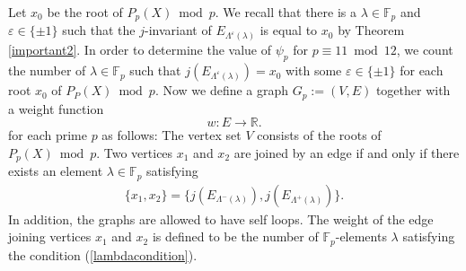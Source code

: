 \documentclass[a4paper, 11pt]{article}
\theoremstyle{plain}
\newcommand{\?}{\textcolor{red}{??}}
\newcommand{\lm}{\lambda}
\newcommand{\Lm}{\Lambda}
\newcommand{\fp}{\mathbb{F}_p}
\begin{document}
Let $x_0$ be the root of $P_p(X) \bmod p$. We recall that there is a $\lm\in \fp$ and $\varepsilon\in\{\pm1\}$ such that the $j$-invariant of $E_{\Lm^{\varepsilon}(\lm)}$  is equal to $x_0$ by Theorem \ref{important2}. In order to determine the value of $\psi_p$ for $p \equiv 11 \bmod 12$, we count the number of $\lm \in \fp$ such that $j(E_{\Lm^{\varepsilon}(\lm)})=x_0$ with some $\varepsilon\in\{\pm1\}$ for each root $x_0$ of $P_P(X) \bmod p$. Now we define a graph $G_p:=(V,E)$ together with a weight function
\[
w : E \to \mathbb{R}.
\] for each prime $p$ as follows: The vertex set $V$ consists of the roots of $P_p(X) \bmod p$. Two vertices $x_1$ and $x_2$ are joined by an edge if and only if there exists an element $\lm \in \fp$ satisfying 
\begin{eqnarray}
\label{lambdacondition}
    \{x_1,x_2\}=\{j(E_{\Lm^{-}(\lm)}),j(E_{\Lm^{+}(\lm)})\}.
\end{eqnarray}
In addition, the graphs are allowed to have self loops. The weight of the edge joining vertices $x_1$ and $x_2$ is defined to be the number of $\fp$-elements $\lambda$ satisfying the condition (\ref{lambdacondition}).

\end{document}
